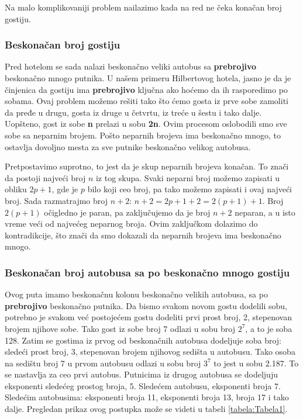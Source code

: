 \documentclass[a4paper]{article}
\begin{document}
Na malo komplikovaniji problem nailazimo kada na red ne čeka konačan broj gostiju.\\

\subsubsection{Beskonačan broj gostiju}
\label{potpotpoglavlje:Beskonačan broj gostiju}
Pred hotelom se sada nalazi beskonačno veliki autobus sa \textbf {prebrojivo} beskonačno mnogo putnika.
U našem primeru Hilbertovog hotela, jasno je da je činjenica da gostiju ima \textbf {prebrojivo} ključna ako hoćemo da ih rasporedimo po sobama.
Ovaj problem možemo rešiti tako što ćemo gosta iz prve sobe zamoliti da pređe u drugu, gosta iz druge u četvrtu, iz treće u šestu i tako dalje.
Uopšteno, gost iz sobe \textbf{n} prelazi u sobu \textbf{2n}. Ovim procesom oslobodili smo sve sobe sa neparnim brojem.
Pošto neparnih brojeva ima beskonačno mnogo, to ostavlja dovoljno mesta za sve putnike beskonačno velikog autobusa.\\

\vspace{0,5cm}

Pretpostavimo suprotno, to jest da je skup neparnih brojeva konačan.
To znači da postoji najveći broj $n$ iz tog skupa.
Svaki neparni broj možemo zapisati u obliku $2p+1$, gde je $p$ bilo koji ceo broj, pa tako možemo zapisati i ovaj najveći broj.
Sada razmatrajmo broj $n+2$: $n+2=2p+1+2=2(p+1)+1$.
Broj $2(p+1)$ očigledno je paran, pa zaključujemo da je broj $n+2$ neparan, a u isto vreme veći od najvećeg neparnog broja.
Ovim zaključkom dolazimo do kontradikcije, što znači da smo dokazali da neparnih brojeva ima beskonačno mnogo.



\newpage

\subsubsection{Beskonačan broj autobusa sa po beskonačno mnogo gostiju}
\label{potpotpoglavlje:Beskonačan broj autobusa sa po beskonačno mnogo gostiju}
Ovog puta imamo beskonačnu kolonu beskonačno velikih autobusa, sa po \textbf {prebrojivo} beskonačno putnika. Da bismo svakom novom gostu dodelili sobu, potrebno je svakom već postojećem gostu dodeliti prvi prost broj, 2, stepenovan brojem njihove sobe. Tako gost iz sobe broj 7 odlazi u sobu broj $2^7$, a to je soba 128. Zatim se gostima iz prvog od beskonačnih autobusa dodeljuje soba broj: sledeći prost broj, 3, stepenovan brojem njihovog sedišta u autobusu. Tako osoba na sedištu broj 7 u prvom autobusu odlazi u sobu broj $3^7$ to jest u sobu 2.187. To se nastavlja za ceo prvi autobus. Putnicima iz drugog autobusa se dodeljuju eksponenti sledećeg prostog broja, 5. Sledećem autobusu, eksponenti broja 7. Sledećim autobusima: eksponenti broja 11, eksponenti broja 13, broja 17 i tako dalje. Pregledan prikaz ovog postupka može se videti u tabeli \ref{tabela:Tabela1}.
\end{document}
